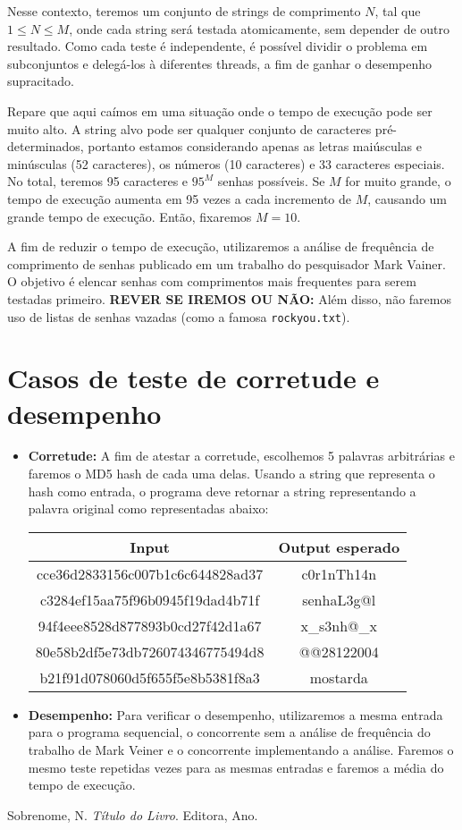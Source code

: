 \documentclass[12pt, a4paper]{article}
\begin{document}
Nesse contexto, teremos um conjunto de strings de comprimento $N$, tal que $1 \leq N \leq M$, onde cada string será testada atomicamente, sem depender de outro resultado. Como cada teste é independente, é possível dividir o problema em subconjuntos e delegá-los à diferentes threads, a fim de ganhar o desempenho supracitado.

Repare que aqui caímos em uma situação onde o tempo de execução pode ser muito alto. A string alvo pode ser qualquer conjunto de caracteres pré-determinados, portanto estamos considerando apenas as letras maiúsculas e minúsculas (52 caracteres), os números (10 caracteres) e 33 caracteres especiais. No total, teremos 95 caracteres e $95^{M}$ senhas possíveis. Se $M$ for muito grande, o tempo de execução aumenta em 95 vezes a cada incremento de $M$, causando um grande tempo de execução. Então, fixaremos $M=10$.

A fim de reduzir o tempo de execução, utilizaremos a análise de frequência de comprimento de senhas publicado em um trabalho do pesquisador Mark Vainer. O objetivo é elencar senhas com comprimentos mais frequentes para serem testadas primeiro. \textbf{REVER SE IREMOS OU NÃO: }Além disso, não faremos uso de listas de senhas vazadas (como a famosa \texttt{rockyou.txt}).

\section{Casos de teste de corretude e desempenho}
\begin{itemize}
    \item \textbf{Corretude:} A fim de atestar a corretude, escolhemos 5 palavras arbitrárias e faremos o MD5 hash de cada uma delas. Usando a string que representa o hash como entrada, o programa deve retornar a string representando a palavra original como representadas abaixo:
    \begin{center}
    \begin{tabular}{ |c|c| } 
     \hline
     Input & Output esperado \\
     \hline
     cce36d2833156c007b1c6c644828ad37 & c0r1nTh14n \\
     c3284ef15aa75f96b0945f19dad4b71f & senhaL3g@l \\
     94f4eee8528d877893b0cd27f42d1a67 & x\_s3nh@\_x \\
     80e58b2df5e73db726074346775494d8 & @@28122004 \\
     b21f91d078060d5f655f5e8b5381f8a3 & mostarda  \\
     \hline
    \end{tabular}

    \end{center}

        \item \textbf{Desempenho:} Para verificar o desempenho, utilizaremos a mesma entrada para o programa sequencial, o concorrente sem a análise de frequência do trabalho de Mark Veiner e o concorrente implementando a análise. Faremos o mesmo teste repetidas vezes para as mesmas entradas e faremos a média do tempo de execução.
\end{itemize}

\begin{thebibliography}{9}
    Sobrenome, N. \textit{Título do Livro}. Editora, Ano.


\end{thebibliography}
\end{document}
